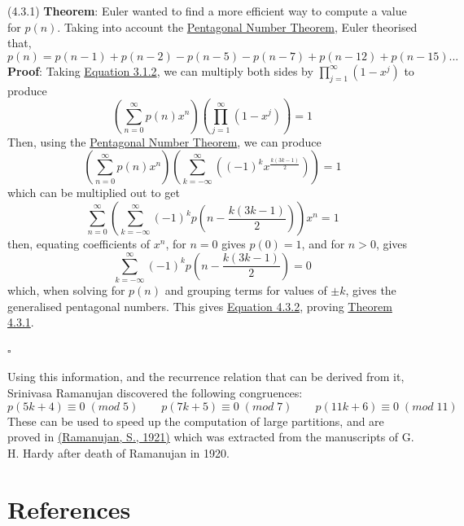 \documentclass{article}
\newcommand{\theorem}[2]{(#1) \textbf{Theorem}: #2}
\newcommand{\proof}[1]{\textbf{Proof}: #1 \begin{flushright}\(\square\)\end{flushright}}
\begin{document}
\theorem{4.3.1}\label{thm:4.3.1}{Euler wanted to find a more efficient way to compute a value for \(p(n)\). Taking into account the \hyperref[thm:4.2.2]{Pentagonal Number Theorem}, Euler theorised that,}
\begin{equation}\tag{4.3.2}\label{eq:4.3.2}
    p(n) = p(n-1) + p(n-2) - p(n-5) - p(n-7) + p(n-12) + p(n - 15)...
\end{equation}
\proof{Taking \hyperref[eq:3.1.2]{Equation 3.1.2}, we can multiply both sides by \(\prod^\infty_{j=1}\left(1-x^j\right)\) to produce
\begin{equation}\tag{4.3.3}\label{eq:4.3.3}
    \left( \sum^\infty_{n=0} p(n)x^n \right) \left( \prod^\infty_{j=1} \left(1-x^j\right) \right) = 1
\end{equation}
Then, using the \hyperref[thm:4.2.2]{Pentagonal Number Theorem}, we can produce
\begin{equation}\tag{4.3.4}\label{eq:4.3.4}
    \left( \sum^\infty_{n=0} p(n)x^n \right) \left( \sum^\infty_{k=-\infty} \left( (-1)^kx^{\frac{k(3k-1)}{2}} \right) \right) = 1
\end{equation}
which can be multiplied out to get
\begin{equation}\tag{4.3.5}\label{eq:4.3.5}
    \sum^\infty_{n=0} \left( \sum^\infty_{k=-\infty}(-1)^k p\left( n-{\frac{k(3k-1)}{2}} \right) \right)x^n = 1
\end{equation}
then, equating coefficients of \(x^n\), for \(n=0\) gives \(p(0)=1\), and for \(n > 0\), gives
\begin{equation}\tag{4.3.6}\label{eq:4.3.6}
    \sum^\infty_{k=-\infty}(-1)^k p\left( n-{\frac{k(3k-1)}{2}} \right) = 0
\end{equation}
\newpage \noindent which, when solving for \(p(n)\) and grouping terms for values of \(\pm k\), gives the generalised pentagonal numbers. This gives \hyperref[eq:4.3.2]{Equation 4.3.2}, proving \hyperref[thm:4.3.1]{Theorem 4.3.1}.}

\noindent Using this information, and the recurrence relation that can be derived from it, Srinivasa Ramanujan discovered the following congruences:
\[p(5k+4) \equiv 0 \; (mod \; 5) \quad\quad p(7k+5) \equiv 0 \; (mod \; 7) \quad\quad p(11k+6) \equiv 0 \; (mod \; 11)\]
These can be used to speed up the computation of large partitions, and are proved in \hyperref[cit:5]{(Ramanujan, S., 1921)} which was extracted from the manuscripts of G. H. Hardy after death of Ramanujan in 1920.

\newpage\section*{References}
\addtocounter{page}{-1}
\pagestyle{empty}
\end{document}
